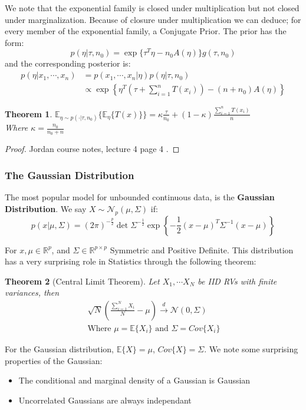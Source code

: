 \documentclass[]{article}
\theoremstyle{mattstyle}
\newtheorem{theorem}{Theorem}[section]
\theoremstyle{definition}
\begin{document}
We note that the exponential family is closed under multiplication but not closed under marginalization. Because of closure under multiplication we can deduce; for every member of the exponential family, a Conjugate Prior. The prior has the form:
$$ p(\eta | \tau, n_0) = \exp\{ \tau^T\eta - n_0A(\eta)\}g(\tau,n_0)$$  
and the corresponding posterior is:
\begin{align*}
p( \eta | x_1, \cdots, x_n) &= p(x_1, \cdots, x_n | \eta)p(\eta| \tau, n_0)\\
&\propto\exp\left\{\eta^T\left(\tau + \sum_{i=1}^nT(x_i)\right) - (n + n_0)A(\eta)\right\}
\end{align*}
\begin{theorem}
	$\mathbb{E}_{\eta \sim p(\cdot| \tau, n_0)}\{\mathbb{E}_{\eta}\{ T(x)\}\} = \kappa \frac{\tau}{n_0} + (1-\kappa)\frac{\sum_{i=1}^nT(x_i)}{n}$\\
	Where $\kappa = \frac{n_0}{n_0 + n}$
\end{theorem}
\begin{proof}
	Jordan course notes, lecture 4 page 4 \cite{MJordanNotes}.
\end{proof}

\subsubsection{The Gaussian Distribution}

The most popular model for unbounded continuous data, is the \textbf{Gaussian Distribution}. We say \(X \sim \mathcal{N}_p(\mu, \Sigma)\) if:
$$p(x|\mu, \Sigma)={(2\pi)}^{-\frac{p}{2}}\det \Sigma^{-\frac{1}{2}}\exp{ \left\{-\frac{1}{2}(x-\mu)^T\Sigma^{-1}(x-\mu) \right\} } $$

For \(x, \mu\in\mathbb{R}^p\), and \(\Sigma \in \mathbb{R}^{p \times p}\) Symmetric and Positive Definite. This distribution has a very surprising role in Statistics through the following theorem:
\begin{theorem}[Central Limit Theorem]
	Let $X_1, \cdots X_N$ be IID RVs with finite variances, then 
	\begin{align*}
	&\sqrt{N}\left(\frac{\sum_{i=1}^N X_i}{N} - \mu\right) \overset{d}{\rightarrow} \mathcal{N}(0, \Sigma)\\
	&\text{Where $\mu = \mathbb{E}\{X_i\}$ and $\Sigma = Cov\{X_i\}$ }
	\end{align*}
\end{theorem}
For the Gaussian distribution, $\mathbb{E}\{X\}=\mu$, $Cov\{X\}=\Sigma$. We note some surprising properties of the Gaussian:
\begin{itemize}
	\item The conditional and marginal density of a Gaussian is Gaussian
	\item Uncorrelated Gaussians are always independant
\end{itemize}
\end{document}
